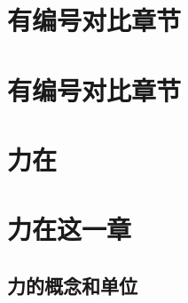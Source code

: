 \chapter*[超长测试文字]{}

\lipsum

\chapter{有编号对比章节}

\begin{Block}
	\lipsum[1]
\end{Block}

\lipsum[1]

\chaptersaying{\lipsum[1][1-2]}
\chapter{有编号对比章节}

\lipsum[1-2]


\chapter*[始终测试文字]{力在}

\lipsum

\chaptersaying{\lipsum[1][1-2]}
\chapter[继续测试文字]{力在这一章}




\section[AAAAA]{力的概念和单位}








\makeatletter


%
%
%

